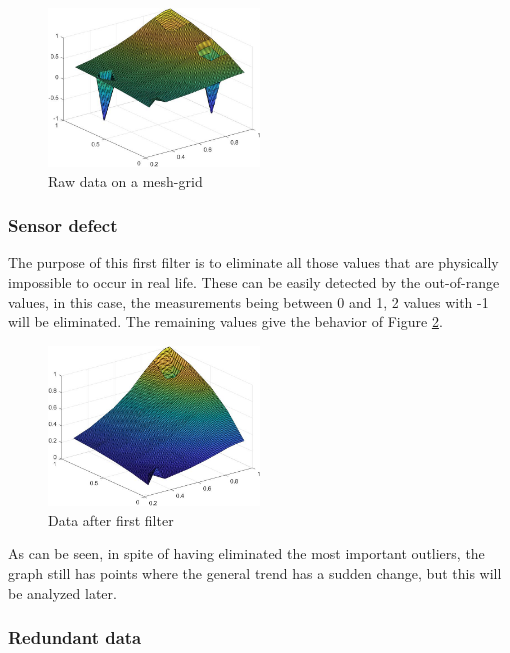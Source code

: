 \documentclass{article}
\begin{document}
\begin{doublespacing}
\begin{figure}[H] 
    \centering
    \includegraphics[width=0.5\textwidth]{Images/RawData1.JPG} 
    \caption{Raw data on a mesh-grid} 
    \label{fig:RawData1} 
\end{figure}


\subsubsection{Sensor defect}

\par The purpose of this first filter is to eliminate all those values that are physically impossible to occur in real life. These can be easily detected by the out-of-range values, in this case, the measurements being between 0 and 1, 2 values with -1 will be eliminated. The remaining values give the behavior of Figure \ref{fig:FirstFilter1}.

\begin{figure}[H] 
    \centering
    \includegraphics[width=0.5\textwidth]{Images/FirstFilter1.JPG} 
    \caption{Data after first filter} 
    \label{fig:FirstFilter1} 
\end{figure}



\par As can be seen, in spite of having eliminated the most important outliers, the graph still has points where the general trend has a sudden change, but this will be analyzed later.

\subsubsection{Redundant data}


\end{doublespacing}
\end{document}
